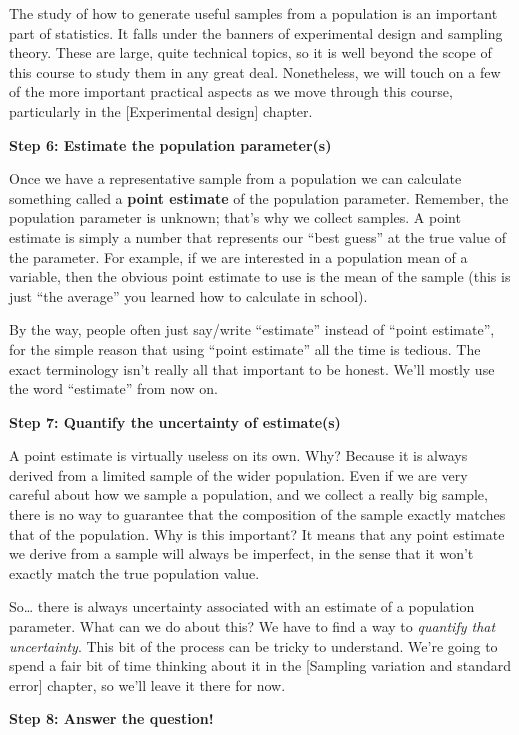 \documentclass[]{book}
\begin{document}
The study of how to generate useful samples from a population is an
important part of statistics. It falls under the banners of experimental
design and sampling theory. These are large, quite technical topics, so
it is well beyond the scope of this course to study them in any great
deal. Nonetheless, we will touch on a few of the more important
practical aspects as we move through this course, particularly in the
{[}Experimental design{]} chapter.

\textbf{Step 6: Estimate the population parameter(s)}

Once we have a representative sample from a population we can calculate
something called a \textbf{point estimate} of the population parameter.
Remember, the population parameter is unknown; that's why we collect
samples. A point estimate is simply a number that represents our ``best
guess'' at the true value of the parameter. For example, if we are
interested in a population mean of a variable, then the obvious point
estimate to use is the mean of the sample (this is just ``the average''
you learned how to calculate in school).

By the way, people often just say/write ``estimate'' instead of ``point
estimate'', for the simple reason that using ``point estimate'' all the
time is tedious. The exact terminology isn't really all that important
to be honest. We'll mostly use the word ``estimate'' from now on.

\textbf{Step 7: Quantify the uncertainty of estimate(s)}

A point estimate is virtually useless on its own. Why? Because it is
always derived from a limited sample of the wider population. Even if we
are very careful about how we sample a population, and we collect a
really big sample, there is no way to guarantee that the composition of
the sample exactly matches that of the population. Why is this
important? It means that any point estimate we derive from a sample will
always be imperfect, in the sense that it won't exactly match the true
population value.

So\ldots{} there is always uncertainty associated with an estimate of a
population parameter. What can we do about this? We have to find a way
to \emph{quantify that uncertainty}. This bit of the process can be
tricky to understand. We're going to spend a fair bit of time thinking
about it in the {[}Sampling variation and standard error{]} chapter, so
we'll leave it there for now.

\textbf{Step 8: Answer the question!}
\end{document}
